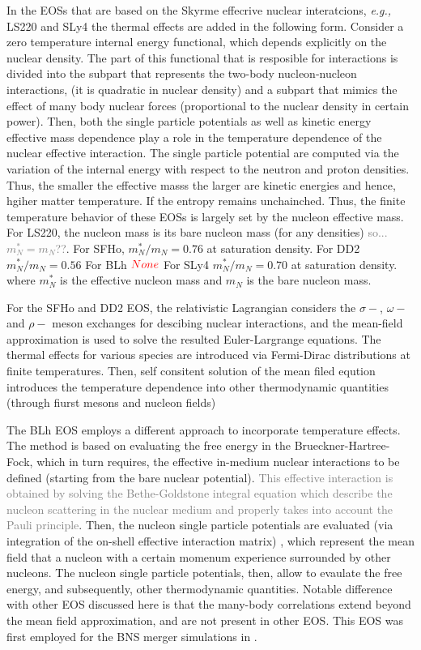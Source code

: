 \documentclass[11pt,a4paper,headinclude=true,DIV=14,BCOR=8mm,chapterprefix,listof=totoc,twoside,openright,abstracton]{scrbook}
\newcommand{\red}[1]{\textcolor{red}{#1}}
\newcommand{\gray}[1]{\textcolor{gray}{#1}}
\begin{document}
In the EOSs that are based on the Skyrme effecrive nuclear interatcions, \textit{e.g.,} LS220 and SLy4
the thermal effects are added in the following form. 
Consider a zero temperature internal energy functional, which depends explicitly on the nuclear density.
The part of this functional that is resposible for interactions is divided into the 
subpart that represents the two-body nucleon-nucleon interactions, (it is quadratic in nuclear density) and a 
subpart that mimics the effect of many body nuclear forces (proportional to the nuclear density in certain power).
Then, both the single particle potentials as well as kinetic energy effective mass dependence play a role
in the temperature dependence of the nuclear effective interaction.
The single particle potential are computed via the variation of the internal energy with respect to the 
neutron and proton densities.
Thus, the smaller the effective masss the larger are kinetic energies and hence, hgiher matter temperature. 
If the entropy remains unchainched.
Thus, the finite temperature behavior of these EOSs is largely set by the nucleon effective mass.
For LS220, the nucleon mass is its bare nucleon mass (for any densities) \gray{so... $m_{N}^*=m_{N}$??}.
For SFHo, $m_N ^* / m_N = 0.76$ at saturation density. 
For DD2 $m_N^*/m_N = 0.56$ 
For BLh $\red{None}$ 
For SLy4 $m_N^*/m_N=0.70$ at saturation density. 
where $m_{N}^*$ is the effective nucleon mass and $m_N$ is the bare nucleon mass.

For the SFHo and DD2 EOS, the relativistic Lagrangian considers the $\sigma-$, $\omega-$ and $\rho-$
meson exchanges for descibing nuclear interactions, and the mean-field approximation is used
to solve the resulted Euler-Largrange equations. 
The thermal effects for various species are introduced via Fermi-Dirac distributions at finite temperatures.
Then, self consitent solution of the mean filed eqution introduces the temperature dependence into other 
thermodynamic quantities (through fiurst mesons and nucleon fields)

The BLh EOS employs a different approach to incorporate temperature effects.
The method is based on evaluating the free energy in the Brueckner-Hartree-Fock, which in turn requires,
the effective in-medium nuclear interactions to be defined (starting from the bare nuclear potential).
\gray{This effective interaction is obtained by solving
the Bethe-Goldstone integral equation which describe the nucleon 
scattering in the nuclear medium and properly takes into
account the Pauli principle}.
Then, the nucleon single particle potentials are evaluated (via integration of the on-shell effective interaction matrix)
, which represent the mean field that a nucleon with a certain momenum experience surrounded by other nucleons.
The nucleon single particle potentials, then, allow to evaulate the free energy, and subsequently, 
other thermodynamic quantities.
Notable difference with other EOS discussed here is that the many-body correlations extend beyond the mean field approximation, and are not present in other EOS. 
This EOS was first employed for the BNS merger simulations in \cite{Bernuzzi:2020txg}.
\end{document}
